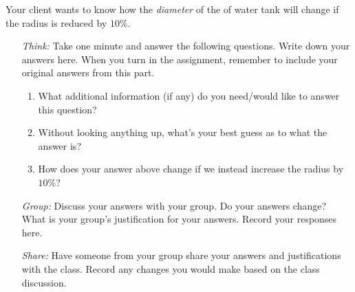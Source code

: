 \documentclass[handout,noauthor]{../ximera}
\begin{document}
\begin{question} %
  Your client wants to know how the \emph{diameter} of the of water tank will
  change if the radius is reduced by $10\%$.
  
    \begin{itemize} 
    \item[\emph{Think:}] Take one minute and answer the following questions. Write down your answers here. When you turn in the assignment, remember to include your original answers from this part.
  \begin{enumerate}
  \item What additional information (if any) do you need/would like
    to answer this question?
    \vspace{1in}
  \item Without looking anything up, what's
    your best guess as to what the answer is?
        \vspace{.5in}

  \item How does your answer above change if we instead increase the
    radius by $10\%$?
        \vspace{.5in}

  \end{enumerate}
  
  \item[\emph{Group:}] Discuss your answers with your group. Do your answers change? What is your group's justification for your answers. Record your responses here.
  
  \vfill
  \item[\emph{Share:}] Have someone from your group share your answers and justifications with the class. Record any changes you would make based on the class discussion.
  \vfill
    \end{itemize}
\end{question}

\mynewpage
\end{document}
